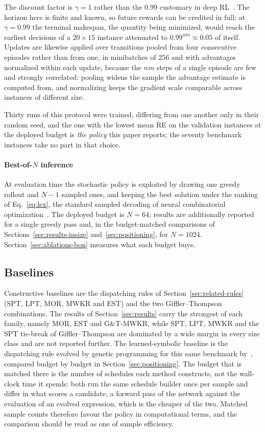 \documentclass[preprint,authoryear,12pt]{elsarticle}
\theoremstyle{definition}
\theoremstyle{remark}
\begin{document}
The discount factor is $\gamma=1$ rather than the $0.99$ customary in
deep RL~\citep{Schulman2017}. The horizon here is finite and known,
so future rewards can be credited in full; at $\gamma=0.99$ the
terminal makespan, the quantity being minimized, would reach the
earliest decisions of a $20{\times}15$ instance attenuated to
$0.99^{nm}\approx0.05$ of itself. Updates are likewise applied over
transitions pooled from four consecutive episodes rather than from
one, in minibatches of $256$ and with advantages normalized within
each update, because the $nm$ steps of a single episode are few and
strongly correlated: pooling widens the sample the advantage estimate
is computed from, and normalizing keeps the gradient scale
comparable across instances of different size.

Thirty runs of this protocol were trained, differing from one
another only in their random seed, and the one with the lowest mean
RE on the validation instances at the deployed budget is \emph{the
policy} this paper reports; the seventy benchmark instances take no
part in that choice.

\paragraph{Best-of-$N$ inference} At evaluation time the stochastic
policy is exploited by drawing one greedy rollout and $N-1$ sampled
ones, and keeping the best solution under the ranking of
Eq.~\eqref{eq:lex}, the standard sampled decoding of neural
combinatorial optimization~\citep{Kool2019}. The deployed budget is
$N{=}64$; results are additionally reported for a single greedy pass
and, in the budget-matched comparisons of
Sections~\ref{sec:results-insize} and~\ref{sec:positioning}, for
$N{=}1024$. Section~\ref{sec:ablations-bon} measures what each budget
buys.

\subsection{Baselines}
\label{sec:baselines}

Constructive baselines are the dispatching rules of
Section~\ref{sec:related-rules} (SPT, LPT, MOR, MWKR and EST) and
the two Giffler--Thompson combinations. The results of
Section~\ref{sec:results} carry the strongest of each family, namely
MOR, EST and G\&T-MWKR, while SPT, LPT, MWKR and the SPT tie-break of
Giffler--Thompson are dominated by a wide margin in every size class
and are not reported further. The
learned-symbolic baseline is the dispatching rule evolved by genetic
programming for this same benchmark by~\citet{DiazGP2026}, compared budget by budget in
Section~\ref{sec:positioning}. The budget that is matched there is the
number of schedules each method constructs, not the wall-clock time it
spends: both run the same schedule builder once per sample and differ
in what scores a candidate, a forward pass of the network against the
evaluation of an evolved expression, which is the cheaper of the two.
Matched sample counts therefore favour the policy in computational
terms, and the comparison should be read as one of sample efficiency.
\end{document}
